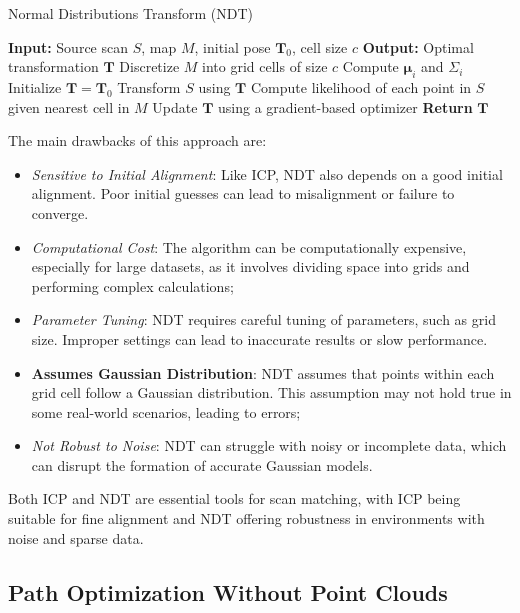 \begin{algorithm}[H]
\caption{Normal Distributions Transform (NDT)}
\begin{algorithmic}[1]
\State \textbf{Input:} Source scan \( S \), map \( M \), initial pose \( \mathbf{T}_0 \), cell size \( c \)
\State \textbf{Output:} Optimal transformation \( \mathbf{T} \)
\State Discretize \( M \) into grid cells of size \( c \)
    \State Compute \( \boldsymbol{\mu}_i \) and \( \Sigma_i \)
\EndFor
\State Initialize \( \mathbf{T} = \mathbf{T}_0 \)
\Repeat
    \State Transform \( S \) using \( \mathbf{T} \)
    \State Compute likelihood of each point in \( S \) given nearest cell in \( M \)
    \State Update \( \mathbf{T} \) using a gradient-based optimizer
\State \textbf{Return} \( \mathbf{T} \)
\end{algorithmic}
\end{algorithm}

The main drawbacks of this approach are:
\begin{itemize}
    \item \textit{Sensitive to Initial Alignment}: Like ICP, NDT also depends on a good initial alignment. Poor initial guesses can lead to misalignment or failure to converge.
    \item \textit{Computational Cost}: The algorithm can be computationally expensive, especially for large datasets, as it involves dividing space into grids and performing complex calculations;
    \item \textit{Parameter Tuning}: NDT requires careful tuning of parameters, such as grid size. Improper settings can lead to inaccurate results or slow performance.
    \item \textbf{Assumes Gaussian Distribution}: NDT assumes that points within each grid cell follow a Gaussian distribution. This assumption may not hold true in some real-world scenarios, leading to errors;
    \item \textit{Not Robust to Noise}: NDT can struggle with noisy or incomplete data, which can disrupt the formation of accurate Gaussian models.
\end{itemize}

Both ICP and NDT are essential tools for scan matching, with ICP being suitable for fine alignment and NDT offering robustness in environments with noise and sparse data.

\subsection*{Path Optimization Without Point Clouds}

